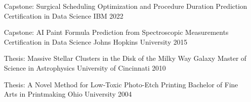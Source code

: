 \begin{cventries}
  \cvshortentry
    {Capstone: Surgical Scheduling Optimization and Procedure Duration Prediction} %
    {Certification in Data Science} %
    {IBM} %
    {2022} %

  \cvshortentry
    {Capstone: AI Paint Formula Prediction from Spectroscopic Measurements} %
    {Certification in Data Science} %
    {Johns Hopkins University} %
    {2015} %

  \cvshortentry
    {Thesis: Massive Stellar Clusters in the Disk of the Milky Way Galaxy} %
    {Master of Science in Astrophysics} %
    {University of Cincinnati} %
    {2010} %

  \cvshortentry
    {Thesis: A Novel Method for Low-Toxic Photo-Etch Printing} %
    {Bachelor of Fine Arts in Printmaking} %
    {Ohio University} %
    {2004} %
    
\end{cventries}